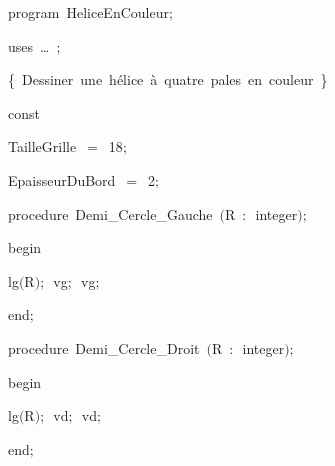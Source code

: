 
{
\parindent {}
\medskip

\carrenoir
\vspace{\neglskip}\mbox{\blc  \idt  \mcl program\idt \ HeliceEnCouleur$;$
}\par 
\vspace{\neglskip}\mbox{\blc \blk\idt \mcl uses\idt \ \ldots\ $;$
}\par 
\medskip

\vspace{\neglskip}\mbox{\blc  \blk\idt  \cmt  \{\ Dessiner\ une\ hélice\ à\ quatre\ pales\ en\ couleur\ \}\idt }\par 
\medskip

\pagebreak[3] 
\vspace{\neglskip}\mbox{\blc  \blk\idt  \mcl const\idt }\par 
\vspace{\neglskip}\mbox{\blc  \blk\blk\idt  TailleGrille\ $=$\ 18$;$}\par 
\vspace{\neglskip}\mbox{\blc  \blk\blk\idt  EpaisseurDuBord\ $=$\ 2$;$}\par 
\medskip

\pagebreak[3] 
\vspace{\neglskip}\mbox{\blc  \blk\idt  \mcl procedure\idt \ Demi\_Cercle\_Gauche\ $($R\ $:$\ integer$)$$;$}\par 
\vspace{\neglskip}\mbox{\blc  \blk\idt  \mcl begin\idt }\par 
\vspace{\neglskip}\mbox{\blc  \blk\blk\idt  lg$($R$)$$;$\ vg$;$\ vg$;$}\par 
\vspace{\neglskip}\mbox{\blc  \blk\idt  \mcl end\idt $;$}\par 
\medskip

\pagebreak[3] 
\vspace{\neglskip}\mbox{\blc  \blk\idt  \mcl procedure\idt \ Demi\_Cercle\_Droit\ $($R\ $:$\ integer$)$$;$}\par 
\vspace{\neglskip}\mbox{\blc  \blk\idt  \mcl begin\idt }\par 
\vspace{\neglskip}\mbox{\blc  \blk\blk\idt  lg$($R$)$$;$\ vd$;$\ vd$;$}\par 
\vspace{\neglskip}\mbox{\blc  \blk\idt  \mcl end\idt $;$}\par 
\medskip

}
